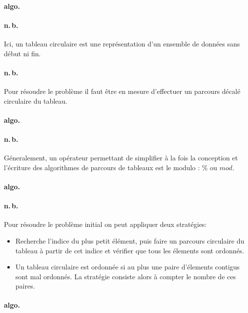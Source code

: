 \documentclass{report}
\begin{document}
      \paragraph{algo.}

      \paragraph{n.\,b.} Ici, un tableau circulaire est une représentation d'un ensemble de données sans début ni fin.

      \paragraph{n.\,b.} Pour résoudre le problème il faut être en mesure d'effectuer un parcours décalé circulaire du tableau.

      \paragraph{algo.}

      \paragraph{n.\,b.} Géneralement, un opérateur permettant de simplifier à la fois la conception et l'écriture des algorithmes de parcours de tableaux est le modulo : $\%$ ou $mod$.

      \paragraph{algo.}

      \paragraph{n.\,b.} Pour résoudre le problème initial on peut appliquer deux stratégies:
      \begin{itemize}
        \item Recherche l'indice du plus petit élément, puis faire un parcours circulaire du tableau à partir de cet indice et vérifier que tous les élements sont ordonnés.
        \item Un tableau circulaire est ordonnée si au plus une paire d'élements contigus sont mal ordonnés. La stratégie consiste alors à compter le nombre de ces paires.
      \end{itemize}

      \paragraph{algo.}
\end{document}
